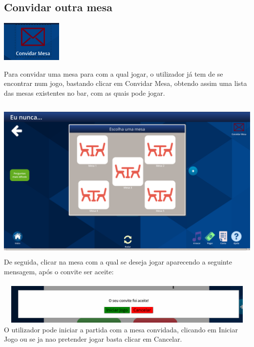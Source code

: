 \documentclass{article}
\begin{document}
\subsection{Convidar outra mesa}
\begin{center}
\includegraphics[width=3cm]{user_manual_images/invite_button.png}
\end{center}
Para convidar uma mesa para com a qual jogar, o utilizador já tem de se encontrar num jogo, bastando clicar em Convidar Mesa, obtendo assim uma lista das mesas existentes no bar, com as quais pode jogar.\\\\
\includegraphics[width=15cm, height=8cm]{user_manual_images/invite_table.png}
De seguida, clicar na mesa com a qual se deseja jogar aparecendo a seguinte mensagem, após o convite ser aceite:\\\\
\includegraphics[width=15cm, height=2cm]{user_manual_images/acepted_popup.png}
O utilizador pode iniciar a partida com a mesa convidada, clicando em Iniciar Jogo ou se ja nao pretender jogar basta clicar em Cancelar.
\end{document}
